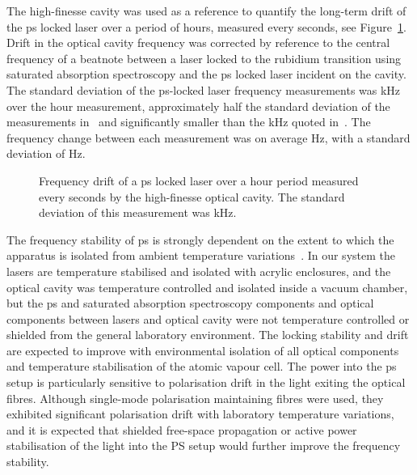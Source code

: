 The high-finesse cavity was used as a reference to quantify the long-term drift of the \gls{ps} locked laser over a period of \unit[60]{hours}, measured every \unit[10]{seconds}, see Figure~\ref{figure:ps_drift}.
Drift in the optical cavity frequency was corrected by reference to the central frequency of a beatnote between a laser locked to the rubidium transition using saturated absorption spectroscopy and the \gls{ps} locked laser incident on the cavity.
The standard deviation of the \gls{ps}-locked laser frequency measurements was \unit[51]{kHz} over the \unit[60]{hour} measurement, approximately half the standard deviation of the measurements in~\cite{tiwari_laser_2006} and significantly smaller than the \unit[400]{kHz} quoted in~\cite{lee_frequency_2014}.
The frequency change between each measurement was on average \unit[5]{Hz}, with a standard deviation of \unit[210]{Hz}.

\begin{figure}
\center

\caption[Long-term frequency drift of a laser locked with polarisation spectroscopy.]{Frequency drift of a \gls{ps} locked laser over a \unit[60]{hour} period measured every \unit[10]{seconds} by the high-finesse optical cavity. The standard deviation of this measurement was \unit[51]{kHz}.}
\label{figure:ps_drift}
\end{figure}

The frequency stability of \gls{ps} is strongly dependent on the extent to which the apparatus is isolated from ambient temperature variations~\cite{yoshikawa_frequency_2003}.
In our system the lasers are temperature stabilised and isolated with acrylic enclosures, and the optical cavity was temperature controlled and isolated inside a vacuum chamber, but the \gls{ps} and saturated absorption spectroscopy components and optical components between lasers and optical cavity were not temperature controlled or shielded from the general laboratory environment.
The locking stability and drift are expected to improve with environmental isolation of all optical components and temperature stabilisation of the atomic vapour cell.
The power into the \gls{ps} setup is particularly sensitive to polarisation drift in the light exiting the optical fibres.
Although single-mode polarisation maintaining fibres were used, they exhibited significant polarisation drift with laboratory temperature variations, and it is expected that shielded free-space propagation or active power stabilisation of the light into the PS setup would further improve the frequency stability.
